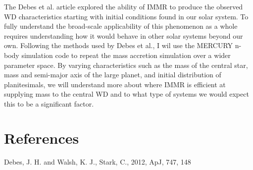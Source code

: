 \documentclass[a4paper,11pt]{article}
\begin{document}
The Debes et al. article explored the ability of IMMR to produce the observed WD 
characteristics starting with initial conditions found in our solar system.  To fully understand the broad-scale applicability
of this phenomenon as a whole requires understanding how it would behave in other solar systems beyond our own.  
Following the methods used by Debes et al., I wil use the MERCURY n-body simulation code to repeat the mass accretion
simulation over a wider parameter space.  By varying characteristics such as the mass of the central star, mass and semi-major axis of the large planet, and initial distribution of planitesimals, we will understand more about where IMMR is efficient at supplying mass to the central WD and to what type of systems we would expect this to be a significant factor. 

\section*{References}
Debes, J. H. and Walsh, K. J., Stark, C., 2012, ApJ, 747, 148 \\
\end{document}
